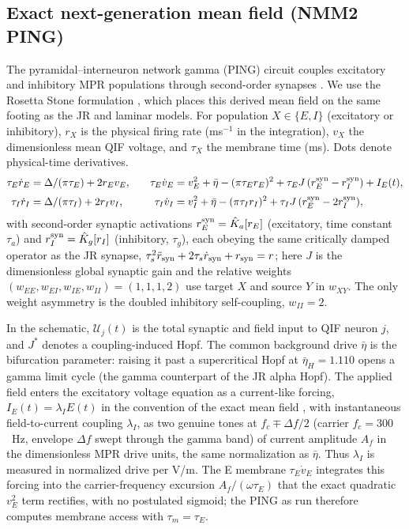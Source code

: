 \documentclass[11pt,a4paper]{article}
\begin{document}
\subsection{Exact next-generation mean field (NMM2 PING)}\label{sec:nmm2-methods}
The pyramidal--interneuron network gamma (PING) circuit couples excitatory
and inhibitory MPR populations through
second-order synapses \cite{montbrio2015,ruffini2021nmm2,clusella2023}.
We use the Rosetta Stone formulation \cite{ruffini2025rosetta}, which places this
derived mean field on the same footing as the JR and laminar models. For
population $X\in\{E,I\}$ (excitatory or inhibitory), $r_X$ is the physical
firing rate (ms$^{-1}$ in the integration), $v_X$ the dimensionless mean QIF
voltage, and $\tau_X$ the membrane time (ms). Dots denote physical-time derivatives.
\begin{equation}
\begin{aligned}
\tau_E\dot r_E&=\Delta/(\pi\tau_E)+2r_Ev_E, &\quad
\tau_E\dot v_E&=v_E^2+\bar\eta-(\pi\tau_E r_E)^2+\tau_E J\,(r_E^{\rm syn}-r_I^{\rm syn})+I_E(t),\\[2pt]
\tau_I\dot r_I&=\Delta/(\pi\tau_I)+2r_Iv_I, &\quad
\tau_I\dot v_I&=v_I^2+\bar\eta-(\pi\tau_I r_I)^2+\tau_I J\,(r_E^{\rm syn}-2r_I^{\rm syn}),
\end{aligned}
\label{eq:nmm2-ping}
\end{equation}
with second-order synaptic activations $r_E^{\rm syn}=\hat K_a[r_E]$ (excitatory, time constant
$\tau_a$) and $r_I^{\rm syn}=\hat K_g[r_I]$ (inhibitory, $\tau_g$), each obeying the same
critically damped operator as the JR synapse, $\tau_s^2\ddot r_{\rm syn}+2\tau_s\dot r_{\rm syn}+r_{\rm syn}=r$; here $J$
is the dimensionless global synaptic gain and the relative weights $(w_{EE},w_{EI},w_{IE},w_{II})=(1,1,1,2)$
use target $X$ and source $Y$ in $w_{XY}$. The only weight asymmetry is the
doubled inhibitory self-coupling, $w_{II}=2$.

In the schematic, $\mathcal U_j(t)$ is the total synaptic and field input
to QIF neuron $j$, and $J^*$ denotes a coupling-induced Hopf.
The common background drive $\bar\eta$ is the bifurcation parameter: raising it
past a supercritical Hopf at $\bar\eta_H=1.110$ opens a gamma limit cycle (the gamma
counterpart of the JR alpha Hopf). The applied field enters the excitatory voltage equation
as a current-like forcing, $I_E(t)=\lambda_I E(t)$ in the convention of the exact mean field
\cite{ruffini2021nmm2}, with instantaneous field-to-current coupling $\lambda_I$, as two genuine tones at
$f_c\mp\Delta f/2$ (carrier $f_c=300$~Hz, envelope $\Delta f$ swept through the gamma band)
of current amplitude $A_f$ in the dimensionless MPR drive units, the same
normalization as $\bar\eta$. Thus $\lambda_I$ is measured in normalized drive per V/m. The E membrane $\tau_E\dot v_E$
integrates this forcing into the carrier-frequency excursion $A_f/(\omega\tau_E)$ that the
exact quadratic $v_E^2$ term rectifies, with no postulated sigmoid; the PING as run
therefore computes membrane access with $\tau_m=\tau_E$.
\end{document}
